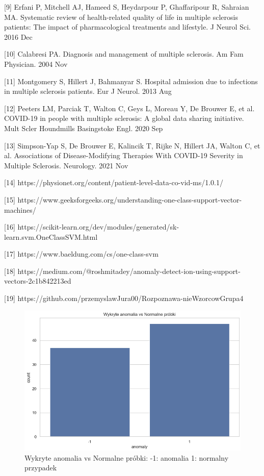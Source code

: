 \documentclass[a4paper,fleqn]{cas-dc}
\begin{document}
[9] Erfani P, Mitchell AJ, Hameed S, Heydarpour P, Ghaffaripour R, Sahraian MA. Systematic review of health-related quality of life in multiple sclerosis patients: The impact of pharmacological treatments and lifestyle. J Neurol Sci. 2016 Dec

[10] Calabresi PA. Diagnosis and management of multiple sclerosis. Am Fam Physician. 2004 Nov

[11] Montgomery S, Hillert J, Bahmanyar S. Hospital admission due to infections in multiple sclerosis patients. Eur J Neurol. 2013 Aug

[12] Peeters LM, Parciak T, Walton C, Geys L, Moreau Y, De Brouwer E, et al. COVID-19 in people with multiple sclerosis: A global data sharing initiative. Mult Scler Houndmills Basingstoke Engl. 2020 Sep

[13] Simpson-Yap S, De Brouwer E, Kalincik T, Rijke N, Hillert JA, Walton C, et al. Associations of Disease-Modifying Therapies With COVID-19 Severity in Multiple Sclerosis. 
Neurology. 2021 Nov

[14] https://physionet.org/content/patient-level-data-co-vid-ms/1.0.1/

[15] https://www.geeksforgeeks.org/understanding-one-class-support-vector-machines/

[16] https://scikit-learn.org/dev/modules/generated/sk-learn.svm.OneClassSVM.html

[17] https://www.baeldung.com/cs/one-class-svm

[18] https://medium.com/@roshmitadey/anomaly-detect-ion-using-support-vectors-2c1b842213ed

[19] https://github.com/przemyslawJura00/Rozpoznawa-nieWzorcowGrupa4




\newpage
\newpage
\begin{figure}[h]
	\includegraphics[scale=.40]{wykresy/wykres1.png}
	\caption{Wykryte anomalia vs Normalne próbki: -1: anomalia 1: normalny przypadek}
	\label{FIG:1}
\end{figure}
\end{document}
